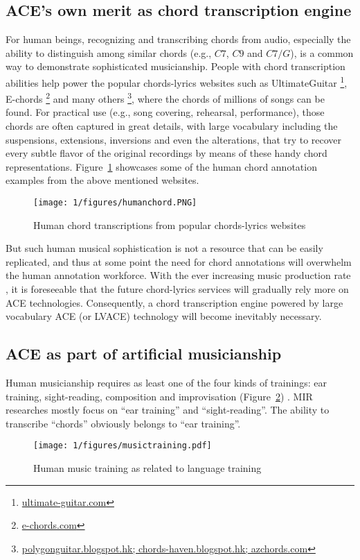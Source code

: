 \subsection{ACE's own merit as chord transcription engine}
For human beings, recognizing and transcribing chords from audio, especially the ability to distinguish among similar chords (e.g., $C7$, $C9$ and $C7/G$), is a common way to demonstrate sophisticated musicianship. People with chord transcription abilities help power the popular chords-lyrics websites such as UltimateGuitar \footnote{\url{ultimate-guitar.com}}, E-chords \footnote{\url{e-chords.com}} and many others \footnote{\url{polygonguitar.blogspot.hk; chords-haven.blogspot.hk; azchords.com}}, where the chords of millions of songs can be found. For practical use (e.g., song covering, rehearsal, performance), those chords are often captured in great details, with large vocabulary including the suspensions, extensions, inversions and even the alterations, that try to recover every subtle flavor of the original recordings by means of these handy chord representations. Figure~\ref{fig:1-humanchord} showcases some of the human chord annotation examples from the above mentioned websites.
\begin{figure}[htb]
\centering
\texttt{[image: 1/figures/humanchord.PNG]}
\caption{Human chord transcriptions from popular chords-lyrics websites}
\label{fig:1-humanchord}
\end{figure}

But such human musical sophistication is not a resource that can be easily replicated, and thus at some point the need for chord annotations will overwhelm the human annotation workforce. With the ever increasing music production rate \cite{globalmusicreport}, it is foreseeable that the future chord-lyrics services will gradually rely more on ACE technologies. Consequently, a chord transcription engine powered by large vocabulary ACE (or LVACE) technology will become inevitably necessary.

\subsection{ACE as part of artificial musicianship}
Human musicianship requires as least one of the four kinds of trainings: ear training, sight-reading, composition and improvisation (Figure~\ref{fig:1-musictraining}) . MIR researches mostly focus on ``ear training'' and ``sight-reading''. The ability to transcribe ``chords'' obviously belongs to ``ear training''.
\begin{figure}[htb]
\centering
\texttt{[image: 1/figures/musictraining.pdf]}
\caption{Human music training as related to language training}
\label{fig:1-musictraining}
\end{figure}


